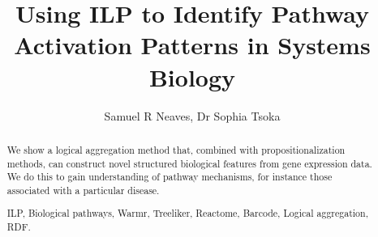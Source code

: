 \documentclass[runningheads,a4paper]{llncs}
\newcommand{\keywords}[1]{\par\addvspace\baselineskip
\noindent\keywordname\enspace\ignorespaces#1}
\begin{document}
\mainmatter  %

%
\title{Using ILP to Identify Pathway Activation Patterns in Systems Biology}

%
%
\author{Samuel R Neaves, Dr Sophia Tsoka}
%


%
%

\maketitle


\begin{abstract}
We show a logical aggregation method that, combined with
propositionalization methods, can construct novel structured biological
features from gene expression data. We do this to gain understanding of pathway
mechanisms, for instance those associated with a particular disease.

\keywords{ILP, Biological pathways, Warmr, Treeliker, Reactome, Barcode, Logical aggregation, RDF.}
\end{abstract}
\end{document}
